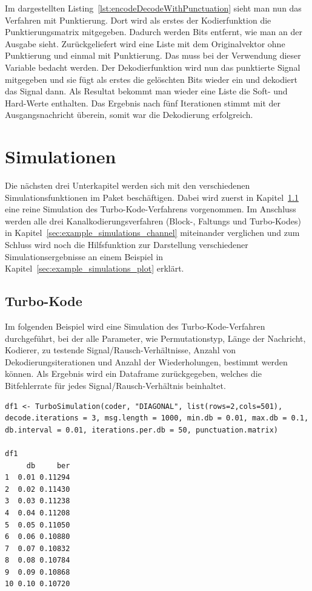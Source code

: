 Im dargestellten Listing~\ref{lst:encodeDecodeWithPunctuation} sieht man nun das Verfahren mit Punktierung. Dort wird als erstes der Kodierfunktion die Punktierungsmatrix mitgegeben. Dadurch werden Bits entfernt, wie man an der Ausgabe sieht. Zurückgeliefert wird eine Liste mit dem Originalvektor ohne Punktierung und einmal mit Punktierung. Das muss bei der Verwendung dieser Variable bedacht werden. Der Dekodierfunktion wird nun das punktierte Signal mitgegeben und sie fügt als erstes die gelöschten Bits wieder ein und dekodiert das Signal dann. Als Resultat bekommt man wieder eine Liste die Soft- und Hard-Werte enthalten. Das Ergebnis nach fünf Iterationen stimmt mit der Ausgangsnachricht überein, somit war die Dekodierung erfolgreich.

\FloatBarrier
\section{Simulationen}
\label{sec:example_simulations}

Die nächsten drei Unterkapitel werden sich mit den verschiedenen Simulationsfunktionen im Paket beschäftigen. Dabei wird zuerst in Kapitel~\ref{sec:example_simulations_turbo} eine reine Simulation des Turbo-Kode-Verfahrens vorgenommen. Im Anschluss werden alle drei Kanalkodierungsverfahren (Block-, Faltungs und Turbo-Kodes) in Kapitel~\ref{sec:example_simulations_channel} miteinander verglichen und zum Schluss wird noch die Hilfsfunktion zur Darstellung verschiedener Simulationsergebnisse an einem Beispiel in Kapitel~\ref{sec:example_simulations_plot} erklärt.

\subsection{Turbo-Kode}
\label{sec:example_simulations_turbo}

Im folgenden Beispiel wird eine Simulation des Turbo-Kode-Verfahren durchgeführt, bei der alle Parameter, wie Permutationstyp, Länge der Nachricht, Kodierer, zu testende Signal/Rausch-Verhältnisse, Anzahl von Dekodierungsiterationen und Anzahl der Wiederholungen, bestimmt werden können. Als Ergebnis wird ein Dataframe zurückgegeben, welches die Bitfehlerrate für jedes Signal/Rausch-Verhältnis beinhaltet.

\begin{lstlisting}[caption=Turbo-Kode-Simulation, label={lst:turboCodeSimulation}, float=!th]
df1 <- TurboSimulation(coder, "DIAGONAL", list(rows=2,cols=501), decode.iterations = 3, msg.length = 1000, min.db = 0.01, max.db = 0.1, db.interval = 0.01, iterations.per.db = 50, punctuation.matrix)

df1
     db     ber
1  0.01 0.11294
2  0.02 0.11430
3  0.03 0.11238
4  0.04 0.11208
5  0.05 0.11050
6  0.06 0.10880
7  0.07 0.10832
8  0.08 0.10784
9  0.09 0.10868
10 0.10 0.10720
\end{lstlisting}

